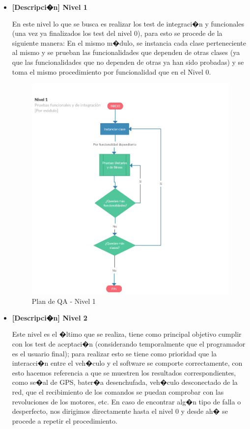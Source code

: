 \begin{itemize}
	\newpage
	
	\item \textbf{[Descripci�n] Nivel 1 }
	
	En este nivel lo que se busca es realizar los test de integraci�n y funcionales (una vez ya finalizados los test del nivel 0), para esto se procede de la siguiente manera:
	En el mismo m�dulo, se instancia cada clase perteneciente al mismo y se prueban las funcionalidades que dependen de otras clases (ya que las funcionalidades que no dependen de otras ya han sido probadas) y se toma el mismo procedimiento por funcionalidad que en el Nivel 0. 
	
	\begin{figure}[h!]
		\centering
		\includegraphics[width=0.7\linewidth, height=0.3\textheight]{Imagenes/Nivel1}
		\caption{Plan de QA - Nivel 1}
		\label{fig:nivel1}
	\end{figure}
	
	\item \textbf{[Descripci�n] Nivel 2}
	
	Este nivel es el �ltimo que se realiza, tiene como principal objetivo cumplir con los test de aceptaci�n (considerando temporalmente que el programador es el usuario final); para realizar esto se tiene como prioridad que la interacci�n entre el veh�culo y el software se comporte correctamente, con esto hacemos referencia a que se muestren los resultados correspondientes, como se�al de GPS, bater�a desenchufada, veh�culo desconectado de la red, que el recibimiento de los comandos se puedan comprobar con las revoluciones de los motores, etc. En caso de encontrar alg�n tipo de falla o desperfecto, nos dirigimos directamente hasta el nivel 0 y desde ah� se procede a repetir el procedimiento. 
	

\end{itemize}
